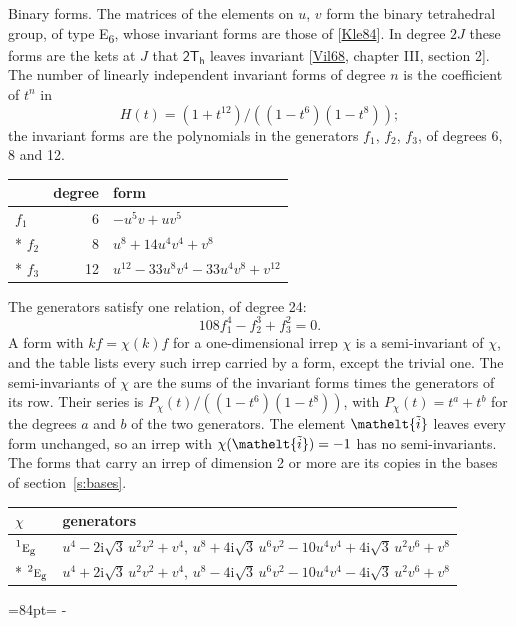 \documentclass[10pt,a4paper]{article}
\makeatletter
\renewcommand\paragraph{\@startsection{paragraph}{4}{\z@}{1.5ex plus .5ex minus .2ex}{-1em}%
  {\normalfont\small\sffamily\bfseries\color{parttitle}}}
\newcommand{\needspace}[1]{\par\penalty-100\begingroup\dimen0=#1\relax\dimen2=\pagegoal
  \advance\dimen2-\pagetotal\ifdim\dimen0>\dimen2\relax\ifdim\dimen2>0pt\vfil\break\fi\fi
  \endgroup}
\numberwithin{equation}{section}
\newcommand{\eltfont}[1]{{\let\sigma\eltsigma\mathelt{#1}}}
\newcommand{\grp}[1]{\mathsf{#1}}
\newcommand{\irr}[1]{\text{\normalfont\scshape #1}}
\newcommand{\conjpair}[1]{{}^{#1}}
\newcommand{\elt}[1]{\eltfont{#1}}
\newcommand{\ptag}[1]{\mathrm{#1}}
\newcommand{\iunit}{\mathrm{i}}
\newcommand{\lift}[1]{\tilde{#1}}
\makeatother
\begin{document}
\paragraph{Binary forms.}
The matrices of the elements on $u$, $v$ form the binary tetrahedral group, of type E\textsubscript{6}, whose invariant forms are those of [\href{../../../REFERENCES.pdf\#ref.Kle84}{Kle84}]. In degree $2J$ these forms are the kets at $J$ that $\grp{2T_{h}}$ leaves invariant [\href{../../../REFERENCES.pdf\#ref.Vil68}{Vil68}, chapter III, section 2]. \label{n:head.degree}\label{n:head.form}The number of linearly independent invariant forms of degree $n$ is the coefficient of $t^n$ in
\begin{equation}\label{e:molien}H(t) = (1 + t^{12})/((1-t^{6})(1-t^{8}));\end{equation}
the invariant forms are the polynomials in the generators $f_1$, $f_2$, $f_3$, of degrees 6, 8 and 12.
{\small\begin{longtable}{@{}lrl@{}}\toprule
& degree & form\\\midrule\endhead
\bottomrule\endfoot\endlastfoot
$f_{1}$ & 6 & $-u^{5}v + uv^{5}$\\*
$f_{2}$ & 8 & $u^{8} + 14u^{4}v^{4} + v^{8}$\\*
$f_{3}$ & 12 & $u^{12} - 33u^{8}v^{4} - 33u^{4}v^{8} + v^{12}$\\
\bottomrule\end{longtable}}
The generators satisfy one relation, of degree 24:
\begin{equation}\label{e:relation}108f_{1}^{4} - f_{2}^{3} + f_{3}^{2} = 0.\end{equation}
A form with $k f = \chi(k) f$ for a one-dimensional irrep $\chi$ is a semi-invariant of $\chi$, and the table lists every such irrep carried by a form, except the trivial one. \label{n:head.generators}The semi-invariants of $\chi$ are the sums of the invariant forms times the generators of its row. Their series is $P_\chi(t)/((1-t^{6})(1-t^{8}))$, with $P_\chi(t) = t^{a} + t^{b}$ for the degrees $a$ and $b$ of the two generators. The element $\elt{\lift{i}}$ leaves every form unchanged, so an irrep with $\chi(\elt{\lift{i}}) = -1$ has no semi-invariants. The forms that carry an irrep of dimension 2 or more are its copies in the bases of section~\ref{s:bases}.
{\small\begin{longtable}{@{}ll@{}}\toprule
$\chi$ & generators\\\midrule\endhead
\bottomrule\endfoot\endlastfoot
$\conjpair{1}\irr{e}_{\ptag{g}}$ & $u^{4} - 2\iunit\sqrt{3}\,u^{2}v^{2} + v^{4}$, $u^{8} + 4\iunit\sqrt{3}\,u^{6}v^{2} - 10u^{4}v^{4} + 4\iunit\sqrt{3}\,u^{2}v^{6} + v^{8}$\\*
$\conjpair{2}\irr{e}_{\ptag{g}}$ & $u^{4} + 2\iunit\sqrt{3}\,u^{2}v^{2} + v^{4}$, $u^{8} - 4\iunit\sqrt{3}\,u^{6}v^{2} - 10u^{4}v^{4} - 4\iunit\sqrt{3}\,u^{2}v^{6} + v^{8}$\\
\bottomrule\end{longtable}}
\needspace{84pt}
\end{document}
